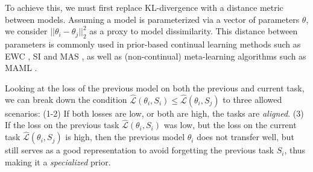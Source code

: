 \documentclass{article}
\theoremstyle{plain}
\theoremstyle{definition}
\theoremstyle{remark}
\newcommand{\RM}[1]{{\textcolor{magenta}{#1}}}
\begin{document}
To achieve this, we must first replace KL-divergence with a distance metric between models. Assuming a model is parameterized via a vector of parameters $\theta$, we consider $||\theta_i-\theta_j||^2_2$ as a proxy to model dissimilarity. This distance between parameters is commonly used in prior-based continual learning methods such as EWC \citep{kirkpatrick2017overcoming}, SI \citep{zenke2017continual} and MAS \citep{aljundi2018memory}, as well as (non-continual) meta-learning algorithms such as MAML \citep{finn2017model}. 

Looking at the loss of the previous model on both the previous and current task, we can break down the condition $\hat{\mathcal{L}}(\theta_{i}, S_i) \leq \hat{\mathcal{L}}(\theta_{i}, S_j)$ to three allowed scenarios: %
%
%
(1-2) If both losses are low, or both are high, the tasks are \emph{aligned}. (3) If the loss on the previous task $\hat{\mathcal{L}}(\theta_{i}, S_i)$ was low, but the loss on the current task $\hat{\mathcal{L}}(\theta_{i}, S_j)$ is high, then the previous model $\theta_i$ does not transfer well, but still serves as a good representation to avoid forgetting the previous task $S_i$, thus making it a \emph{specialized} prior.
\end{document}

